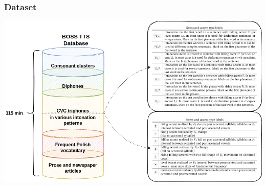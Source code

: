 \documentclass[a4paper,9pt]{beamer}
\theoremstyle{mytheoremstyle}
\begin{document}
\begin{frame}
\frametitle{Dataset}
\begin{center}
  \includegraphics[width=\textwidth]{res/database_structure_explanation}
\end{center}
\end{frame}
\end{document}
